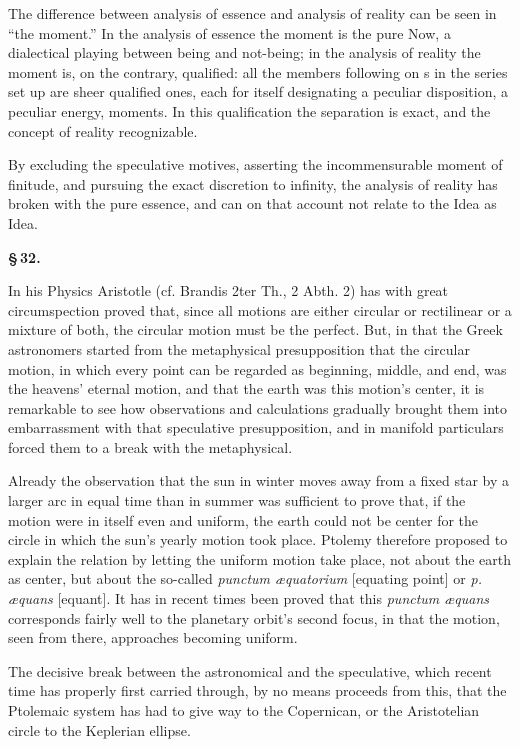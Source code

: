 \documentclass[12pt]{book}
\begin{document}
The difference between analysis of essence and analysis of reality can be seen in ``the moment.'' In the
analysis of essence the moment is the pure Now, a dialectical playing between being and not-being; in the
analysis of reality the moment is, on the contrary, qualified: all the members following on s in the series
set up are sheer qualified ones, each for itself designating a peculiar disposition, a peculiar energy,
moments. In this qualification the separation is exact, and the concept of reality recognizable.

By excluding the speculative motives, asserting the incommensurable moment of finitude, and pursuing the
exact discretion to infinity, the analysis of reality has broken with the pure essence, and can on that
account not relate to the Idea as Idea.

\begin{center}{\bfseries \S\,32.}\end{center}

In his Physics Aristotle (cf. Brandis 2ter Th., 2 Abth. 2) has with great circumspection proved that,
since all motions are either circular or rectilinear or a mixture of both, the circular motion must be the
perfect. But, in that the Greek astronomers started from the metaphysical presupposition that the circular
motion, in which every point can be regarded as beginning, middle, and end, was the heavens' eternal
motion, and that the earth was this motion's center, it is remarkable to see how observations and
calculations gradually brought them into embarrassment with that speculative presupposition, and in
manifold particulars forced them to a break with the metaphysical.

Already the observation that the sun in winter moves away from a fixed star by a larger arc in equal time
than in summer was sufficient to prove that, if the motion were in itself even and uniform, the earth could
not be center for the circle in which the sun's yearly motion took place. Ptolemy therefore proposed to
explain the relation by letting the uniform motion take place, not about the earth as center, but about the
so-called \textit{punctum æquatorium} [equating point] or \textit{p. æquans} [equant]. It has in recent
times been proved that this \textit{punctum æquans} corresponds fairly well to the planetary orbit's second
focus, in that the motion, seen from there, approaches becoming uniform.

The decisive break between the astronomical and the speculative, which recent time has properly first
carried through, by no means proceeds from this, that the Ptolemaic system has had to give way to the
Copernican, or the Aristotelian circle to the Keplerian ellipse.
\end{document}
